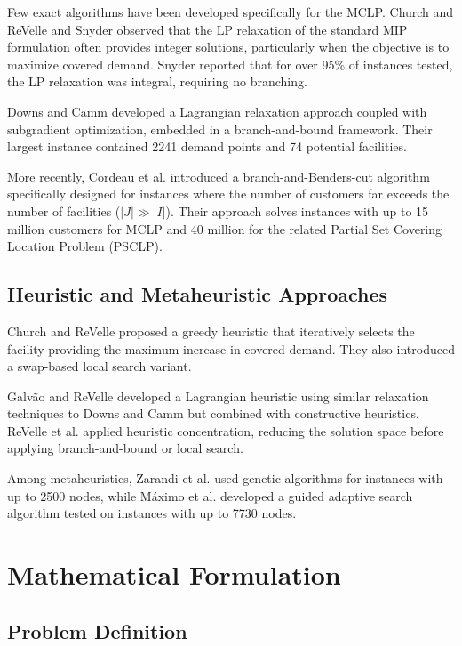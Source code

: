 \documentclass[11pt,a4paper]{article}
\begin{document}
Few exact algorithms have been developed specifically for the MCLP. Church and ReVelle \cite{church1974} and Snyder \cite{snyder2011} observed that the LP relaxation of the standard MIP formulation often provides integer solutions, particularly when the objective is to maximize covered demand. Snyder reported that for over 95\% of instances tested, the LP relaxation was integral, requiring no branching.

Downs and Camm \cite{downs1996} developed a Lagrangian relaxation approach coupled with subgradient optimization, embedded in a branch-and-bound framework. Their largest instance contained 2241 demand points and 74 potential facilities.

More recently, Cordeau et al. \cite{cordeau2019} introduced a branch-and-Benders-cut algorithm specifically designed for instances where the number of customers far exceeds the number of facilities ($|J| \gg |I|$). Their approach solves instances with up to 15 million customers for MCLP and 40 million for the related Partial Set Covering Location Problem (PSCLP).

\subsection{Heuristic and Metaheuristic Approaches}

Church and ReVelle \cite{church1974} proposed a greedy heuristic that iteratively selects the facility providing the maximum increase in covered demand. They also introduced a swap-based local search variant.

Galv\~{a}o and ReVelle \cite{galvao1996} developed a Lagrangian heuristic using similar relaxation techniques to Downs and Camm but combined with constructive heuristics. ReVelle et al. \cite{revelle2008} applied heuristic concentration, reducing the solution space before applying branch-and-bound or local search.

Among metaheuristics, Zarandi et al. \cite{zarandi2011} used genetic algorithms for instances with up to 2500 nodes, while M\'{a}ximo et al. \cite{maximo2017} developed a guided adaptive search algorithm tested on instances with up to 7730 nodes.

\newpage
\section{Mathematical Formulation}

\subsection{Problem Definition}
\end{document}
